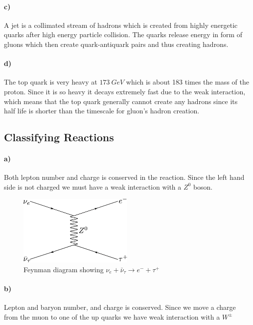 \paragraph{c)} A jet is a collimated stream of hadrons which is created from highly energetic quarks after high energy particle collision. The quarks release energy in form of gluons which then create quark-antiquark pairs and thus creating hadrons.

\paragraph{d)} The top quark is very heavy at $\SI[]{173}{GeV}$ which is about 183 times the mass of the proton. Since it is so heavy it decays extremely fast due to the weak interaction, which means that the top quark generally cannot create any hadrons since its half life is shorter than the timescale for gluon's hadron creation.

\subsection{Classifying Reactions}
\paragraph{a)} Both lepton number and charge is conserved in the reaction. Since the left hand side is not charged we must have a weak interaction with a $Z^0$ boson.

\begin{figure}[H]
	\centering
	\includegraphics[width=0.5\textwidth]{figures/classify_a.pdf}
	\caption{Feynman diagram showing $\nu_e + \bar{\nu}_\tau \to e^- + \tau^+$}
\end{figure}

\paragraph{b)} Lepton and baryon number, and charge is conserved. Since we move a charge from the muon to one of the up quarks we have weak interaction with a $W^{\pm}$

